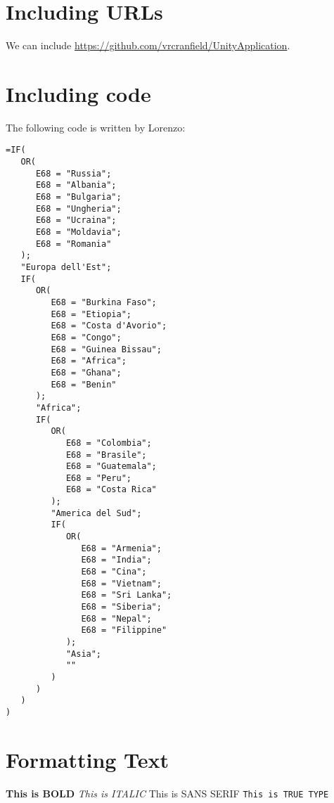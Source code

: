 \section{Including URLs}
We can include \url{https://github.com/vrcranfield/UnityApplication}.

\section{Including code}
The following code is written by Lorenzo:

%			

\begin{minipage}{\linewidth}
\begin{lstlisting}
=IF(
   OR(
      E68 = "Russia";
      E68 = "Albania";
      E68 = "Bulgaria";
      E68 = "Ungheria";
      E68 = "Ucraina";
      E68 = "Moldavia";
      E68 = "Romania"
   );
   "Europa dell'Est";
   IF(
      OR(
         E68 = "Burkina Faso";
         E68 = "Etiopia";
         E68 = "Costa d'Avorio";
         E68 = "Congo";
         E68 = "Guinea Bissau";
         E68 = "Africa";
         E68 = "Ghana";
         E68 = "Benin"
      );
      "Africa";
      IF(
         OR(
            E68 = "Colombia";
            E68 = "Brasile";
            E68 = "Guatemala";
            E68 = "Peru";
            E68 = "Costa Rica"
         );
         "America del Sud";
         IF(
            OR(
               E68 = "Armenia";
               E68 = "India";
               E68 = "Cina";
               E68 = "Vietnam";
               E68 = "Sri Lanka";
               E68 = "Siberia";
               E68 = "Nepal";
               E68 = "Filippine"
            );
            "Asia";
            ""
         )
      )
   )
)
\end{lstlisting}
\end{minipage}

\section{Formatting Text}
\textbf{This is BOLD}
\textit{This is ITALIC}
\textsf{This is SANS SERIF}
\texttt{This is TRUE TYPE}

